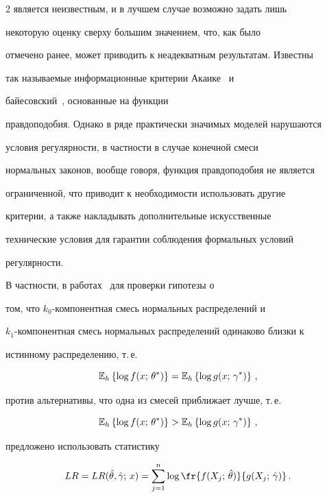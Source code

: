 \begin{multicols}{2}
является неизвестным, и в лучшем случае возможно задать лишь

некоторую оценку сверху большим значением, что, как было

отмечено ранее, может приводить к неадекватным результатам. Известны

так называемые информационные критерии Акаике~\cite{Akaike1973} и

байесовский~\cite{Schwartz1978}, основанные на функции

правдоподобия. Однако в ряде практически значимых моделей нарушаются

условия регулярности, в частности в случае конечной смеси

нормальных законов, вообще говоря, функция правдоподобия не является

ограниченной, что приводит к необходимости использовать другие

критерии, а также накладывать дополнительные искусственные

технические условия для гарантии соблюдения формальных условий

регулярности.



В частности, в работах~\cite{Lo2001, Lo2005} для проверки гипотезы о

том, что $k_0$-ком\-по\-нент\-ная смесь нормальных распределений и

$k_1$-ком\-по\-нент\-ная смесь нормальных распределений одинаково близки к

истинному распределению, т.\,е.

$$

\E_h\left\{\log f(x;\,\theta^*)\right\}=\E_h\left\{\log g(x;\,\gamma^*)\right\}\,,

$$

против альтернативы, что одна из смесей приближает лучше, т.\,е.

$$

\E_h\left\{\log f(x;\,\theta^*)\right\}>\E_h\left\{\log g(x;\,\gamma^*)\right\}\,,

$$

предложено использовать статистику

\begin{equation}

\label{LR}

LR=LR(\Hat\theta,\Hat\gamma;\,x)=\sum\limits_{j=1}^n\log\fr{f(X_j;\,\Hat\theta)}

{g(X_j;\,\Hat\gamma)}\,.

\end{equation}




\end{multicols}
